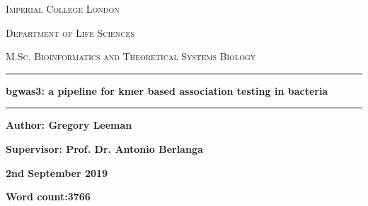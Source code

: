 \begin{titlepage}
\begin{center}

\vspace*{1cm}

\textsc{\large{Imperial College London}}

\textsc{\large{Department of Life Sciences}}

\textsc{\large{M.Sc. Bioinformatics and Theoretical Systems Biology}}

\vspace*{3cm}

\par\noindent\rule{\textwidth}{0.4pt}

\textbf{\Huge{bgwas3: a pipeline for kmer based association testing in bacteria}}
\par\noindent\rule{\textwidth}{0.4pt}

\vspace*{3cm}

\textbf{\Large{Author: Gregory Leeman}}

\textbf{\Large{Supervisor: Prof. Dr. Antonio Berlanga}}

\vfill

\textbf{\large{2nd September 2019}}

\textbf{\large{Word count:3766}}

\vspace{0.8cm}

\end{center}
\end{titlepage}
